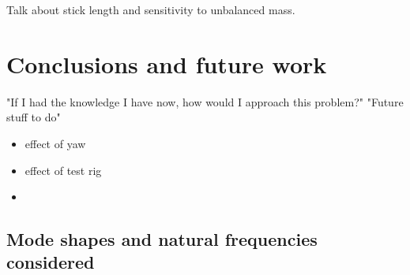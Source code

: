 \documentclass[12pt,a4paper]{article}
\begin{document}
Talk about stick length and sensitivity to unbalanced mass.
\section{Conclusions and future work}
"If I had the knowledge I have now, how would I approach this problem?"
"Future stuff to do"
\begin{itemize}

\item effect of yaw
\item effect of test rig
\item   \end{itemize}





\pagebreak
\begin{appendices}
\section{Mode shapes and natural frequencies considered}

\end{appendices}
\end{document}
